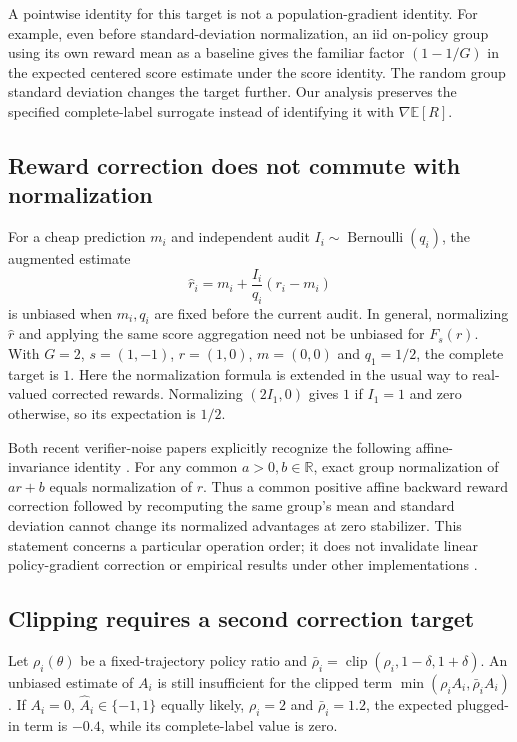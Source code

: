 \documentclass[11pt]{article}
\newcommand{\E}{\mathbb E}
\newcommand{\R}{\mathbb R}
\newcommand{\clip}{\operatorname{clip}}
\begin{document}
A pointwise identity for this target is not a population-gradient identity. For example, even before standard-deviation normalization, an iid on-policy group using its own reward mean as a baseline gives the familiar factor $(1-1/G)$ in the expected centered score estimate under the score identity. The random group standard deviation changes the target further. Our analysis preserves the specified complete-label surrogate instead of identifying it with $\nabla\E[R]$.

\subsection{Reward correction does not commute with normalization}
For a cheap prediction $m_i$ and independent audit $I_i\sim\operatorname{Bernoulli}(q_i)$, the augmented estimate
\begin{equation}\label{eq:ht}
 \widehat r_i=m_i+\frac{I_i}{q_i}(r_i-m_i)
\end{equation}
is unbiased when $m_i,q_i$ are fixed before the current audit. In general, normalizing $\widehat r$ and applying the same score aggregation need not be unbiased for $F_s(r)$. With $G=2$, $s=(1,-1)$, $r=(1,0)$, $m=(0,0)$ and $q_1=1/2$, the complete target is $1$. Here the normalization formula is extended in the usual way to real-valued corrected rewards. Normalizing $(2I_1,0)$ gives $1$ if $I_1=1$ and zero otherwise, so its expectation is $1/2$.

Both recent verifier-noise papers explicitly recognize the following affine-invariance identity \citep{cai2025,mansouri2025}. For any common $a>0,b\in\R$, exact group normalization of $ar+b$ equals normalization of $r$. Thus a common positive affine backward reward correction followed by recomputing the same group's mean and standard deviation cannot change its normalized advantages at zero stabilizer. This statement concerns a particular operation order; it does not invalidate linear policy-gradient correction or empirical results under other implementations \citep{cai2025,mansouri2025}.

\subsection{Clipping requires a second correction target}\label{sec:clipping}
Let $\rho_i(\theta)$ be a fixed-trajectory policy ratio and $\bar\rho_i=\clip(\rho_i,1-\delta,1+\delta)$. An unbiased estimate of $A_i$ is still insufficient for the clipped term $\min(\rho_i A_i,\bar\rho_i A_i)$. If $A_i=0$, $\widehat A_i\in\{-1,1\}$ equally likely, $\rho_i=2$ and $\bar\rho_i=1.2$, the expected plugged-in term is $-0.4$, while its complete-label value is zero.
\end{document}
